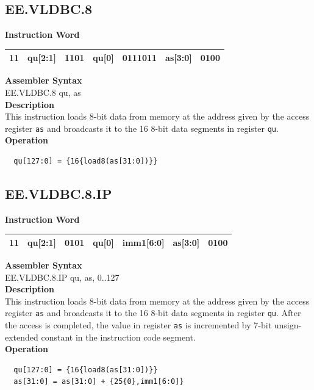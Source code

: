 \clearpage
\subsection{EE.VLDBC.8}\label{instruction:EEVLDBC8}
\setlength\tabcolsep{6pt}
\textbf{Instruction Word} \\
\begin{tabular}{|c|c|c|c|c|c|c|}
	\hline
	11 & qu[2:1] & 1101 & qu[0] & 0111011 & as[3:0] & 0100 \\
	\hline
\end{tabular}

\textbf{Assembler Syntax} \\
EE.VLDBC.8 qu, as \\
\textbf{Description} \\
This instruction loads 8-bit data from memory at the address given by the access register \lstinline{as} and broadcasts it to the 16 8-bit data segments in register \lstinline{qu}.\\
\textbf{Operation}
\begin{lstlisting}
  qu[127:0] = {16{load8(as[31:0])}}
\end{lstlisting}

\clearpage
\subsection{EE.VLDBC.8.IP}\label{instruction:EEVLDBC8IP}
\setlength\tabcolsep{6pt}
\textbf{Instruction Word} \\
\begin{tabular}{|c|c|c|c|c|c|c|}
	\hline
	11 & qu[2:1] & 0101 & qu[0] & imm1[6:0] & as[3:0] & 0100 \\
	\hline
\end{tabular}

\textbf{Assembler Syntax} \\
EE.VLDBC.8.IP qu, as, 0..127 \\
\textbf{Description} \\
This instruction loads 8-bit data from memory at the address given by the access register \lstinline{as} and broadcasts it to the 16 8-bit data segments in register \lstinline{qu}. After the access is completed, the value in register \lstinline{as} is incremented by 7-bit unsign-extended constant in the instruction code segment.\\
\textbf{Operation}
\begin{lstlisting}
  qu[127:0] = {16{load8(as[31:0])}}
  as[31:0] = as[31:0] + {25{0},imm1[6:0]}
\end{lstlisting}

